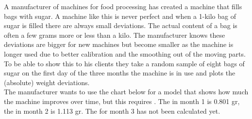 \setcounter{section}{3}
\setcounter{subsection}{2}
\setcounter{question}{0}



A manufacturer of machines for food processing has created a machine that fills bags with sugar. A machine like this is never perfect and when a 1-kilo bag of sugar is filled there are always small deviations. The actual content of a bag is often a few grams more or less than a kilo. The manufacturer knows these deviations are bigger for new machines but become smaller as the machine is longer used due to better calibration and the smoothing out of the moving parts. To be able to show this to his clients they take a random sample of eight bags of sugar on the first day of the three months the machine is in use and plots the (absolute) weight deviations. \\

The manufacturer wants to use the chart below for a model that shows how much the machine improves over time, but this requires . The  in month 1 is 0.801 gr, the  in month 2 is 1.113 gr. The  for month 3 has not been calculated yet. \\

